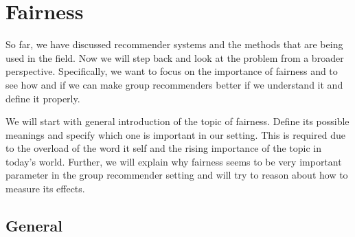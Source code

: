 \chapter{Fairness} \label{chap:fairness}

So far, we have discussed recommender systems and the methods that are being used in the field. Now we will step back and look at the problem from a broader perspective. Specifically, we want to focus on the importance of fairness and to see how and if we can make group recommenders better if we understand it and define it properly.

We will start with general introduction of the topic of fairness. Define its possible meanings and specify which one is important in our setting. This is required due to the overload of the word it self and the rising importance of the topic in today's world. Further, we will explain why fairness seems to be very important parameter in the group recommender setting and will try to reason about how to measure its effects.





\section{General} \label{sec:02_general}




